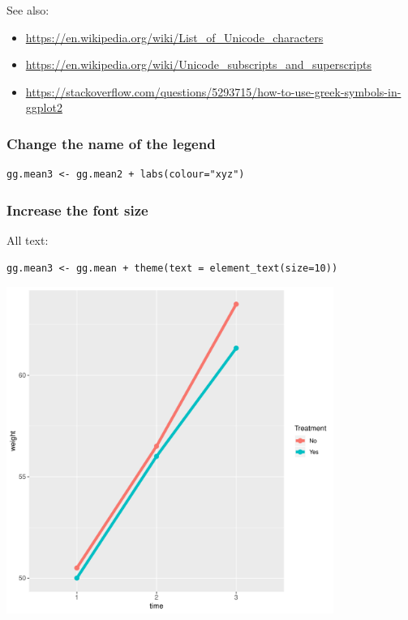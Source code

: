 \documentclass{article}
\begin{document}
See also:
\begin{itemize}
\item \url{https://en.wikipedia.org/wiki/List\_of\_Unicode\_characters}
\item \url{https://en.wikipedia.org/wiki/Unicode\_subscripts\_and\_superscripts}
\item \url{https://stackoverflow.com/questions/5293715/how-to-use-greek-symbols-in-ggplot2}
\end{itemize}

\clearpage
\subsubsection{Change the name of the legend}
\label{sec:org46e2017}
\lstset{language=r,label= ,caption= ,captionpos=b,numbers=none}
\begin{lstlisting}
gg.mean3 <- gg.mean2 + labs(colour="xyz")
\end{lstlisting}

\subsubsection{Increase the font size}
\label{sec:org3217dab}

All text:
\lstset{language=r,label= ,caption= ,captionpos=b,numbers=none}
\begin{lstlisting}
gg.mean3 <- gg.mean + theme(text = element_text(size=10))
\end{lstlisting}

\begin{center}
\includegraphics[width=0.8\textwidth]{./figures/fig-meanTime3.pdf}
\end{center}
\end{document}
